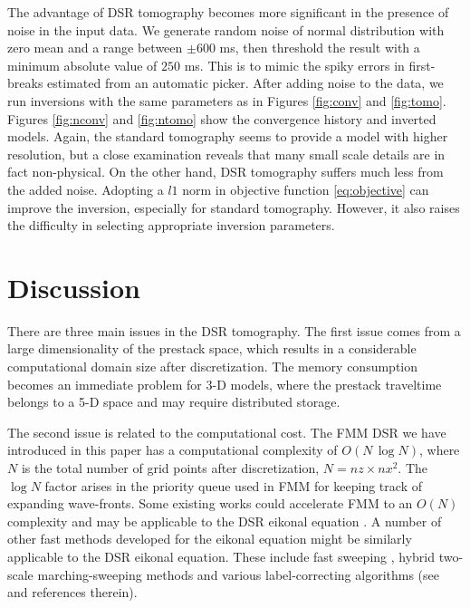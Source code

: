 The advantage of DSR tomography becomes more significant in the presence of 
noise in the input data. We generate random noise of normal distribution with zero mean and a 
range between $\pm 600$ ms, then threshold the result with a minimum absolute value of $250$ ms. This is to mimic 
the spiky errors in first-breaks estimated from an automatic picker. After adding noise to the data, we run 
inversions with the same parameters as in Figures \ref{fig:conv} and \ref{fig:tomo}. Figures \ref{fig:nconv} and 
\ref{fig:ntomo} show the convergence history and inverted models. Again, the standard tomography seems to provide 
a model with higher resolution, but a close examination reveals that many small scale details are in fact 
non-physical. On the other hand, DSR tomography suffers much less from the added noise. Adopting a $l1$ 
norm in objective function \ref{eq:objective} can improve the inversion, especially for standard tomography. 
However, it also raises the difficulty in selecting appropriate inversion 
parameters.

\section{Discussion}

There are three main issues in the DSR tomography. The first issue comes from a large dimensionality of the 
prestack space, which results in a considerable computational domain size after discretization. The memory 
consumption becomes an immediate problem for 3-D models, where the prestack traveltime belongs to a 5-D space 
and may require distributed storage.

The second issue is related to the computational cost. The FMM DSR we have introduced in this 
paper has a computational complexity of $O (N\,\log N)$, where $N$ is the total number of grid points after 
discretization, $N = nz \times nx^2$. The $\log N$ factor arises in the priority queue used in 
FMM for keeping track of expanding wave-fronts. Some existing works could 
accelerate FMM to an $O (N)$ complexity and may be applicable to the DSR eikonal equation \cite[]{kim,yatziv}. A 
number of other fast methods developed for the eikonal equation might be similarly applicable to the DSR eikonal 
equation. These include fast sweeping \cite[]{zhao}, hybrid two-scale marching-sweeping methods and various 
label-correcting algorithms (see \cite{chacon} and references therein).

